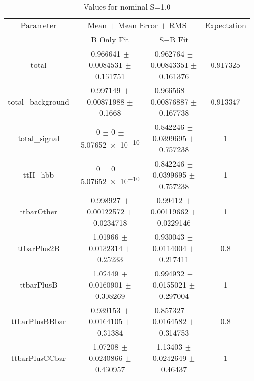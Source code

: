 \begin{table}
\centering
\caption{Values for nominal S=1.0}
\begin{tabular}{cccc}
\toprule
Parameter & \multicolumn{2}{c}{Mean $\pm$ Mean Error $\pm$ RMS} & Expectation\\
 & B-Only Fit & S+B Fit & \\
\midrule
total & \num{0.966641} $\pm$ \num{0.0084531} $\pm$ \num{0.161751} & \num{0.962764} $\pm$ \num{0.00843351} $\pm$ \num{0.161376} & \num{0.917325}\\
total\_background & \num{0.997149} $\pm$ \num{0.00871988} $\pm$ \num{0.1668} & \num{0.966568} $\pm$ \num{0.00876887} $\pm$ \num{0.167738} & \num{0.913347}\\
total\_signal & \num{0} $\pm$ \num{0} $\pm$ \num{5.07652e-10} & \num{0.842246} $\pm$ \num{0.0399695} $\pm$ \num{0.757238} & \num{1}\\
ttH\_hbb & \num{0} $\pm$ \num{0} $\pm$ \num{5.07652e-10} & \num{0.842246} $\pm$ \num{0.0399695} $\pm$ \num{0.757238} & \num{1}\\
ttbarOther & \num{0.998927} $\pm$ \num{0.00122572} $\pm$ \num{0.0234718} & \num{0.99412} $\pm$ \num{0.00119662} $\pm$ \num{0.0229146} & \num{1}\\
ttbarPlus2B & \num{1.01966} $\pm$ \num{0.0132314} $\pm$ \num{0.25233} & \num{0.930043} $\pm$ \num{0.0114004} $\pm$ \num{0.217411} & \num{0.8}\\
ttbarPlusB & \num{1.02449} $\pm$ \num{0.0160901} $\pm$ \num{0.308269} & \num{0.994932} $\pm$ \num{0.0155021} $\pm$ \num{0.297004} & \num{1}\\
ttbarPlusBBbar & \num{0.939153} $\pm$ \num{0.0164105} $\pm$ \num{0.31384} & \num{0.857327} $\pm$ \num{0.0164582} $\pm$ \num{0.314753} & \num{0.8}\\
ttbarPlusCCbar & \num{1.07208} $\pm$ \num{0.0240866} $\pm$ \num{0.460957} & \num{1.13403} $\pm$ \num{0.0242649} $\pm$ \num{0.46437} & \num{1}\\
\bottomrule
\end{tabular}
\end{table}